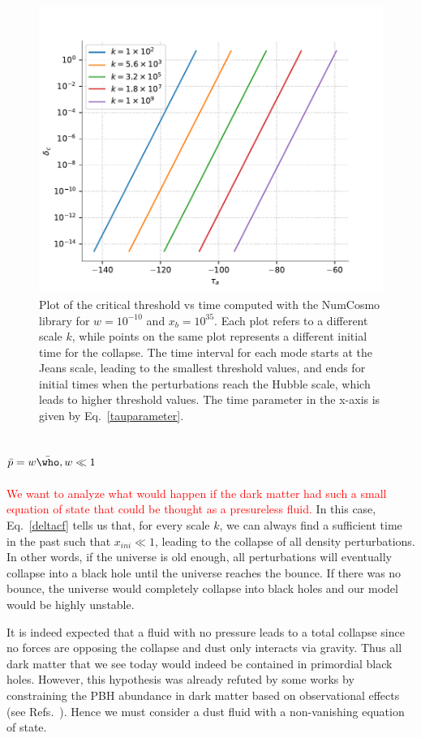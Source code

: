\documentclass[a4paper,11pt]{article}
\begin{document}
\begin{figure}[tbp]
\centering 
\includegraphics[width=.6\textwidth]{deltac_jh_vs_tau.pdf}
\caption{ Plot of the critical threshold vs time computed with the NumCosmo library for $w = 10^{-10}$ and $x_b = 10^{35}$. Each plot refers to a different scale $k$, while points on the same plot represents a different initial time for the collapse. The time interval for each mode starts at the Jeans scale, leading to the smallest threshold values, and ends for initial times when the perturbations reach the Hubble scale, which leads to higher threshold values. The time parameter in the x-axis is given by Eq.~\eqref{tauparameter}.}
\label{deltacfig}
\end{figure}
\newpage
\subsection{$\Bar{p} = w \bar{\who}, w \ll 1$}
\textcolor{red}{We want to analyze what would happen if the dark matter had such a small equation of state that could be thought as a presureless fluid.} In this case, Eq.~\eqref{deltacf} tells us that, for every scale $k$, we can always find a sufficient time in the past such that $x_{ini} \ll 1$, leading to the collapse of all density perturbations. In other words, if the universe is old enough, all perturbations will eventually collapse into a black hole until the universe reaches the bounce. If there was no bounce, the universe would completely collapse into black holes and our model would be highly unstable.

It is indeed expected that a fluid with no pressure leads to a total collapse since no forces are opposing the collapse and dust only interacts via gravity. Thus all dark matter that we see today would indeed be contained in primordial black holes. However, this hypothesis was already refuted by some works by constraining the PBH abundance in dark matter based on observational effects (see Refs.~\cite{Villanueva2021, Carr2021}). Hence we must consider a dust fluid with a non-vanishing equation of state.
\end{document}
